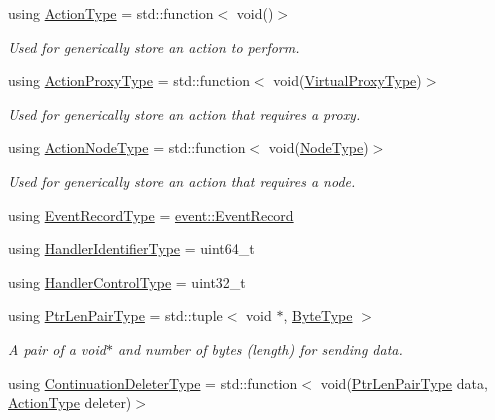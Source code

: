 \begin{DoxyCompactItemize}
using \hyperlink{namespacevt_ae0a5a7b18cc99d7b732cb4d44f46b0f3}{Action\+Type} = std\+::function$<$ void()$>$
\begin{DoxyCompactList}\small\item\em Used for generically store an action to perform. \end{DoxyCompactList}\item 
using \hyperlink{namespacevt_a102aa105d64254d89f7e585d106c95aa}{Action\+Proxy\+Type} = std\+::function$<$ void(\hyperlink{namespacevt_a1b417dd5d684f045bb58a0ede70045ac}{Virtual\+Proxy\+Type})$>$
\begin{DoxyCompactList}\small\item\em Used for generically store an action that requires a proxy. \end{DoxyCompactList}\item 
using \hyperlink{namespacevt_a0436cb2d620dcbb21b5b49cd9c9c4749}{Action\+Node\+Type} = std\+::function$<$ void(\hyperlink{namespacevt_a866da9d0efc19c0a1ce79e9e492f47e2}{Node\+Type})$>$
\begin{DoxyCompactList}\small\item\em Used for generically store an action that requires a node. \end{DoxyCompactList}\item 
using \hyperlink{namespacevt_a2dc2f149222f88a250ec9a13db36865d}{Event\+Record\+Type} = \hyperlink{structvt_1_1event_1_1_event_record}{event\+::\+Event\+Record}
\item 
using \hyperlink{namespacevt_a59ae068fe828d1c33051ff96f3d016b6}{Handler\+Identifier\+Type} = uint64\+\_\+t
\item 
using \hyperlink{namespacevt_adbbef13b92f0a93b14c219b7cc8a48f2}{Handler\+Control\+Type} = uint32\+\_\+t
\item 
using \hyperlink{namespacevt_a97f320a1d3b9b4035e591671cd7d10f0}{Ptr\+Len\+Pair\+Type} = std\+::tuple$<$ void $\ast$, \hyperlink{namespacevt_aab8d55968084610ce3b17057981e9300}{Byte\+Type} $>$
\begin{DoxyCompactList}\small\item\em A pair of a void$\ast$ and number of bytes (length) for sending data. \end{DoxyCompactList}\item 
using \hyperlink{namespacevt_a6de3bd201e2a040be9362d9d24d1e446}{Continuation\+Deleter\+Type} = std\+::function$<$ void(\hyperlink{namespacevt_a97f320a1d3b9b4035e591671cd7d10f0}{Ptr\+Len\+Pair\+Type} data, \hyperlink{namespacevt_ae0a5a7b18cc99d7b732cb4d44f46b0f3}{Action\+Type} deleter)$>$

\end{DoxyCompactItemize}
